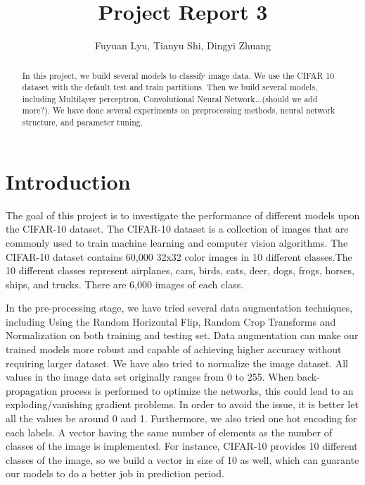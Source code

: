 \documentclass[11pt]{scrartcl}
\title{Project Report 3}
\author{Fuyuan Lyu, Tianyu Shi, Dingyi Zhuang}
\begin{document}
\maketitle

\begin{abstract}
In this project, we build several models to classify image data. We use the CIFAR 10 dataset with the default test and train partitions.
Then we build several models, including Multilayer perceptron, Convolutional Neural Network...(should we add more?). We have done several experiments on preprocessing methods, neural network structure, and parameter tuning.
\end{abstract}
  
\section{Introduction}
The goal of this project is to investigate the performance of different models upon the CIFAR-10 dataset. The CIFAR-10 dataset is a collection of images that are commonly used to train machine learning and computer vision algorithms. The CIFAR-10 dataset contains 60,000 32x32 color images in 10 different classes.The 10 different classes represent airplanes, cars, birds, cats, deer, dogs, frogs, horses, ships, and trucks. There are 6,000 images of each class.

In the pre-processing stage, we have tried several data augmentation techniques, including Using the Random Horizontal Flip, Random Crop Transforms and Normalization on both training and testing set. Data augmentation can make our trained models more robust and capable of achieving higher accuracy without requiring larger dataset.
We have also tried to normalize the image dataset. All values in the image data set originally ranges from 0 to 255. When back-propagation process is performed to optimize the networks, this could lead to an exploding/vanishing gradient problems. In order to avoid the issue, it is better let all the values be around 0 and 1.
Furthermore, we also tried one hot encoding for each labels. A vector having the same number of elements as the number of classes of the image is implemented. For instance, CIFAR-10 provides 10 different classes of the image, so we build a vector in size of 10 as well, which can guarante our models to do a better job in prediction period.
\end{document}
